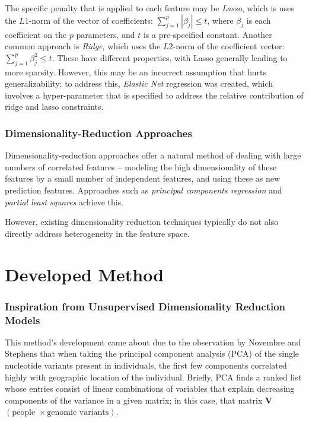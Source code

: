 The specific penalty that is applied to each feature may be \textit{Lasso}, which is uses the $L1$-norm of the vector of coefficients: $\sum_{j=1}^p | \beta_j | \leq t$, where $\beta_j$ is each coefficient on the $p$ parameters, and $t$ is a pre-specified constant. Another common approach is \textit{Ridge}, which uses the $L2$-norm of the coefficient vector:  $\sum_{j=1}^p  \beta_j^2  \leq t$. These have different properties, with Lasso generally leading to more sparsity. However, this may be an incorrect assumption that hurts generalizability; to address this, \textit{Elastic Net} regression was created, which involves a hyper-parameter that is specified to address the relative contribution of ridge and lasso constraints. 


\subsubsection{Dimensionality-Reduction Approaches}

Dimensionality-reduction approaches offer a natural method of dealing with large numbers of correlated features -- modeling the high dimensionality of these features by a small number of independent features, and using these as new prediction features. Approaches such as \textit{principal components regression} and \textit{partial least squares} achieve this.

However, existing dimensionality reduction techniques typically do not also directly address heterogeneity in the feature space. 



\section{Developed Method}
\subsubsection{Inspiration from Unsupervised Dimensionality Reduction Models}

This method’s development came about due to the observation by Novembre and Stephens\cite{novembre_interpreting_2008} that when taking the principal component analysis (PCA) of the single nucleotide variants present in individuals, the first few components correlated highly with geographic location of the individual. Briefly, PCA finds a ranked list whose entries consist of linear combinations of variables that explain decreasing components of the variance in a given matrix; in this case, that matrix $\mathbf{V}$ $(\text{people } \times \text{genomic\ variants})$.

